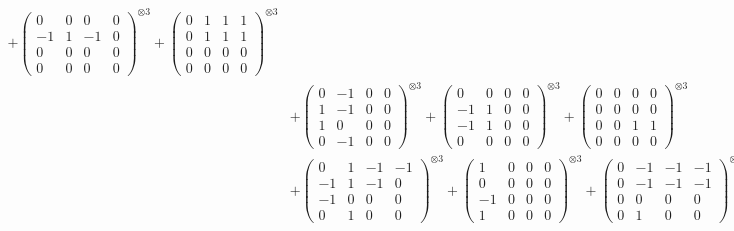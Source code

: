\documentclass{article}
\begin{document}
{\begin{align}
            + \begin{pmatrix} 0 & 0 & 0 & 0 \\ -1 & 1 & -1 & 0 \\ 0 & 0 & 0 & 0 \\ 0 & 0 & 0 & 0 \end{pmatrix}^{\otimes 3} 
            + \begin{pmatrix} 0 & 1 & 1 & 1 \\ 0 & 1 & 1 & 1 \\ 0 & 0 & 0 & 0 \\ 0 & 0 & 0 & 0 \end{pmatrix}^{\otimes 3} \\
        &+ \label{Rs16-Rc11-Solution-31-c10} \begin{pmatrix} 0 & -1 & 0 & 0 \\ 1 & -1 & 0 & 0 \\ 1 & 0 & 0 & 0 \\ 0 & -1 & 0 & 0 \end{pmatrix}^{\otimes 3} 
            + \begin{pmatrix} 0 & 0 & 0 & 0 \\ -1 & 1 & 0 & 0 \\ -1 & 1 & 0 & 0 \\ 0 & 0 & 0 & 0 \end{pmatrix}^{\otimes 3} 
            + \begin{pmatrix} 0 & 0 & 0 & 0 \\ 0 & 0 & 0 & 0 \\ 0 & 0 & 1 & 1 \\ 0 & 0 & 0 & 0 \end{pmatrix}^{\otimes 3} \\
        &+ \label{Rs16-Rc11-Solution-31-c13} \begin{pmatrix} 0 & 1 & -1 & -1 \\ -1 & 1 & -1 & 0 \\ -1 & 0 & 0 & 0 \\ 0 & 1 & 0 & 0 \end{pmatrix}^{\otimes 3} 
            + \begin{pmatrix} 1 & 0 & 0 & 0 \\ 0 & 0 & 0 & 0 \\ -1 & 0 & 0 & 0 \\ 1 & 0 & 0 & 0 \end{pmatrix}^{\otimes 3} 
            + \begin{pmatrix} 0 & -1 & -1 & -1 \\ 0 & -1 & -1 & -1 \\ 0 & 0 & 0 & 0 \\ 0 & 1 & 0 & 0 \end{pmatrix}^{\otimes 3} \\

\end{align}}
\end{document}
